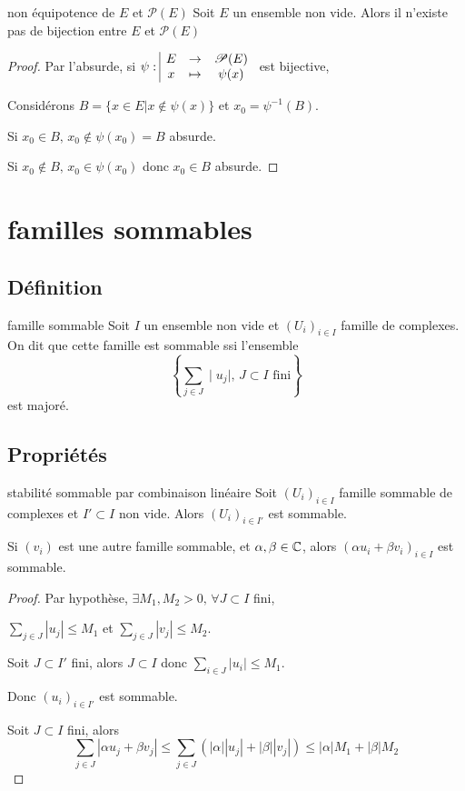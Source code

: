 \begin{theoreme}{non équipotence de $E$ et $\mathscr P(E)$}{}
    Soit $E$ un ensemble non vide. Alors il n'existe pas de bijection entre $E$ et $\mathscr P(E)$
\end{theoreme}

\begin{proof}
    Par l'absurde, si $\psi: \space \begin{array}{|ccc} \displaystyle E & \to & \displaystyle \mathscr P(E) \\ \displaystyle x & \mapsto & \displaystyle \psi(x) \end{array}$ est bijective,

    Considérons $B = \{ x \in E | x \notin \psi(x) \} $ et $x_0 = \psi^{-1}(B)$.

    Si $x_0 \in B, \, x_0 \notin \psi(x_0) = B$ absurde.

    Si $x_0 \notin B, \, x_0 \in \psi(x_0)$ donc $x_0 \in B$ absurde. 
\end{proof}


\section{familles sommables}
\subsection{Définition }

\begin{definition}{famille sommable}{}
    Soit $I$ un ensemble non vide et $(U_i)_{i \in I}$ famille de complexes. 
    On dit que cette famille est sommable ssi l'ensemble 
    $$\left\{\sum_{j \in J} \mid u_j \mid, \, J \subset I \text{ fini} \right\}$$
    est majoré. 
\end{definition}


\subsection{Propriétés }

\begin{proposition}{stabilité sommable par combinaison linéaire}{}
    Soit $(U_i)_{i \in I}$ famille sommable de complexes et $I' \subset I$ non vide. 
    Alors $(U_i)_{i \in I'}$ est sommable. 

    Si $(v_i)$ est une autre famille sommable, et $\alpha, \beta \in \mathbb{C}$, alors 
    $(\alpha u_i + \beta v_i)_{i \in I}$ est sommable.
\end{proposition}


\begin{proof}
    Par hypothèse, $\exists M_1, M_2 > 0, \, \forall J \subset I$ fini, 

    $\displaystyle \sum_{j \in J} |u_j| \leqslant M_1$ et $\displaystyle \sum_{j \in J} |v_j| \leqslant M_2$.

    Soit $J \subset I'$ fini, alors $J \subset I$ donc $\sum_{i \in J } |u_i| \leqslant M_1$.

    Donc $(u_i)_{i \in I'}$ est sommable.

    Soit $J \subset I$ fini, alors
    $$\sum_{j \in J} |\alpha u_j + \beta v_j | \leqslant \sum_{j \in J} (|\alpha| |u_j| + |\beta| |v_j|) \leqslant |\alpha| M_1 + |\beta| M_2$$
\end{proof}


